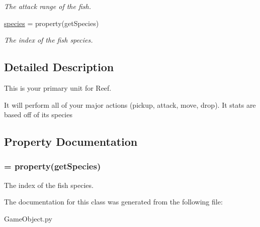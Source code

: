 \begin{DoxyCompactItemize}
\begin{DoxyCompactList}\small\item\em \-The attack range of the fish. \end{DoxyCompactList}\item 
\hyperlink{classGameObject_1_1Fish_a7ff067181afcb3d775aeb4ee6fc2de45}{species} = property(get\-Species)
\begin{DoxyCompactList}\small\item\em \-The index of the fish species. \end{DoxyCompactList}\end{DoxyCompactItemize}


\subsection{\-Detailed \-Description}
\-This is your primary unit for \-Reef. 

\-It will perform all of your major actions (pickup, attack, move, drop). \-It stats are based off of its species 

\subsection{\-Property \-Documentation}
\hypertarget{classGameObject_1_1Fish_a7ff067181afcb3d775aeb4ee6fc2de45}{
\subsubsection[{species}]{ = property(get\-Species)}}\label{classGameObject_1_1Fish_a7ff067181afcb3d775aeb4ee6fc2de45}


\-The index of the fish species. 



\-The documentation for this class was generated from the following file\-:\begin{DoxyCompactItemize}
\item 
\-Game\-Object.\-py\end{DoxyCompactItemize}
